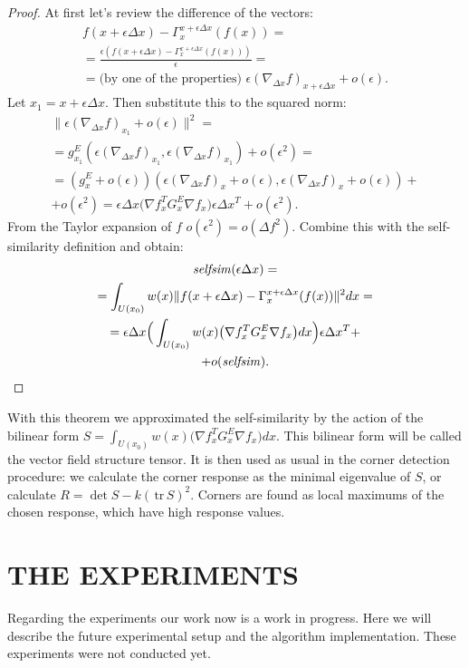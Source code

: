 \documentclass[a4paper,twoside]{article}
\newcommand{\selfsim}{\mathop{\it selfsim}}
\newcommand{\delx}{\Delta x}
\newcommand {\tr}{{\,}\mathrm{tr}{\,}}
\begin{document}
\begin{proof}
At first let's review the difference of the vectors:
\begin{multline*} f(x+\epsilon\delx) - \Gamma_x^{x+\epsilon\delx}(f(x)) = \\
= \frac{\epsilon (f(x+\epsilon\delx) - \Gamma_x^{x+\epsilon\delx}(f(x)))}{\epsilon} = \\
= \textrm{(by one of the properties) }\epsilon(\nabla_{\delx} f)_{x+\epsilon\delx} + o(\epsilon).
\end{multline*}
Let $x_1 = x+\epsilon\delx$. Then substitute this to the squared norm:
\begin{multline*} 
 \|\epsilon(\nabla_{\delx} f)_{x_1} + o(\epsilon)\|^2 = \\
= g^E_{x_1}(\epsilon(\nabla_{\delx} f)_{x_1}, \epsilon(\nabla_{\delx} f)_{x_1}) + o(\epsilon^2) = \\
= (g^E_{x} + o(\epsilon))(\epsilon(\nabla_{\delx} f)_{x} + o(\epsilon), \epsilon(\nabla_{\delx} f)_{x} + o(\epsilon)) + \\ 
+ o(\epsilon^2) = \epsilon\delx\big(\nabla f_x^T G^E_{x} \nabla f_x\big) \epsilon\delx^T + o(\epsilon^2).
\end{multline*}
From the Taylor expansion of $f$ $o(\epsilon^2) = o(\Delta f^2)$. Combine this with the self-similarity definition and obtain:
\begin{multline*}\selfsim(\epsilon\delx) = \\
= \int_{U(x_0)} w(x) \|f(x+\epsilon\delx) - \Gamma_x^{x+\epsilon\delx}(f(x))\|^2 dx = \\
= \epsilon\delx\Big(\int_{U(x_0)} w(x) \big(\nabla f_x^T G^E_{x} \nabla f_x\big) dx\Big) \epsilon\delx^T + \\
+ o(\selfsim).
\end{multline*}
\end{proof}
With this theorem we approximated the self-similarity by the action of the bilinear form $S = \int_{U(x_0)} w(x) \big(\nabla f_x^T G^E_{x} \nabla f_x\big) dx$. This bilinear form will be called the vector field structure tensor. It is then used as usual in the corner detection procedure: we calculate the corner response as the minimal eigenvalue of $S$, or calculate $R=\det S - k (\tr S)^2$. Corners are found as local maximums of the chosen response, which have high response values.

\section{\uppercase{The experiments}}
Regarding the experiments our work now is a work in progress. Here we will describe the future experimental setup and the algorithm implementation. These experiments were not conducted yet.
\end{document}
